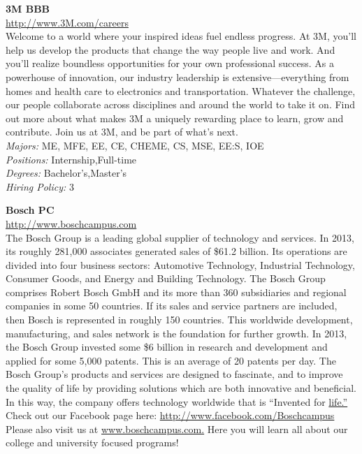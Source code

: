 \documentclass[twoside]{article}
\begin{document}
    \begin{center}\begin{multicols}{2}
    \begin{minipage}{.95\columnwidth}{\Large\bf 3M \hfill BBB}\\
    \url{http://www.3M.com/careers}\\
    Welcome to a world where your inspired ideas fuel endless progress. At 3M, you’ll help us develop the products that change the way people live and work. And you’ll realize boundless opportunities for your own professional success. As a powerhouse of innovation, our industry leadership is extensive—everything from homes and health care to electronics and transportation. Whatever the challenge, our people collaborate across disciplines and around the world to take it on. Find out more about what makes 3M a uniquely rewarding place to learn, grow and contribute. Join us at 3M, and be part of what’s next.\\
    \emph{Majors:} ME, MFE, EE, CE, CHEME, CS, MSE, EE:S, IOE\\
    \emph{Positions:} Internship,Full-time\\
    \emph{Degrees:} Bachelor's,Master's\\
    \emph{Hiring Policy:} 3\\
\end{minipage}
 \begin{minipage}{.95\columnwidth}{\Large\bf Bosch \hfill PC}\\
    \url{http://www.boschcampus.com}\\
    The Bosch Group is a leading global supplier of technology and services. In 2013, its roughly 281,000 associates generated sales of \$61.2 billion. Its operations are divided into four business sectors: Automotive Technology, Industrial Technology, Consumer Goods, and Energy and Building Technology. The Bosch Group comprises Robert Bosch GmbH and its more than 360 subsidiaries and regional companies in some 50 countries. If its sales and service partners are included, then Bosch is represented in roughly 150 countries. This worldwide development, manufacturing, and sales network is the foundation for further growth. In 2013, the Bosch Group invested some \$6 billion in research and development and applied for some 5,000 patents. This is an average of 20 patents per day. The Bosch Group’s products and services are designed to fascinate, and to improve the quality of life by providing solutions which are both innovative and beneficial. In this way, the company offers technology worldwide that is “Invented for \url{life.”} Check out our Facebook page here: \url{http://www.facebook.com/Boschcampus} Please also visit us at \url{www.boschcampus.com.} Here you will learn all about our college and university focused programs!\\

\end{minipage}
\end{multicols}
\end{center}
\end{document}
